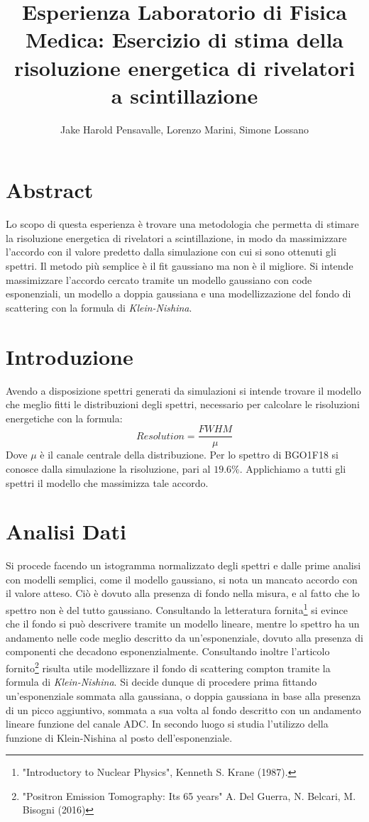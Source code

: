 \documentclass[a4paper]{article}
\title{Esperienza Laboratorio di Fisica Medica: Esercizio di stima della risoluzione energetica di rivelatori a scintillazione}
\author{Jake Harold Pensavalle, Lorenzo Marini, Simone Lossano}
\begin{document}
	\maketitle
	\newpage
	\tableofcontents
	\newpage
\section{Abstract}
Lo scopo di questa esperienza è trovare una metodologia che permetta di stimare la risoluzione energetica di rivelatori a scintillazione, in modo da massimizzare l'accordo con il valore predetto dalla simulazione con cui si sono ottenuti gli spettri. Il metodo più semplice è il fit gaussiano ma non è il migliore. Si intende massimizzare l'accordo cercato tramite un modello gaussiano con code esponenziali, un modello a doppia gaussiana e una modellizzazione del fondo di scattering con la formula di \textit{Klein-Nishina}.
\section{Introduzione}
Avendo a disposizione spettri generati da simulazioni si intende trovare il modello che meglio fitti le distribuzioni degli spettri, necessario per calcolare le risoluzioni energetiche con la formula:
\begin{equation}
Resolution=\frac{FWHM}{\mu}
\end{equation}
Dove $\mu$ è il canale centrale della distribuzione. Per lo spettro di BGO1F18 si conosce dalla simulazione la risoluzione, pari al $19.6\%$. Applichiamo a tutti gli spettri il modello che massimizza tale accordo.
\section{Analisi Dati}
Si procede facendo un istogramma normalizzato degli spettri e dalle prime analisi con modelli semplici, come il modello gaussiano, si nota un mancato accordo con il valore atteso. Ciò è dovuto alla presenza di fondo nella misura, e al fatto che lo spettro non è del tutto gaussiano. Consultando la letteratura fornita\footnote{\label{note1}"Introductory to Nuclear Physics", Kenneth S. Krane (1987).} si evince che il fondo si può descrivere tramite un modello lineare, mentre lo spettro ha un andamento nelle code meglio descritto da un'esponenziale, dovuto alla presenza di componenti che decadono esponenzialmente. Consultando inoltre l'articolo fornito\footnote{\label{note2}"Positron Emission Tomography: Its 65 years"
A. Del Guerra, N. Belcari, M. Bisogni (2016)} risulta utile modellizzare il fondo di scattering compton tramite la formula di \textit{Klein-Nishina}.
Si decide dunque di procedere prima fittando un'esponenziale sommata alla gaussiana, o doppia gaussiana in base alla presenza di un picco aggiuntivo, sommata a sua volta al fondo descritto con un andamento lineare funzione del canale ADC. In secondo luogo si studia l'utilizzo della funzione di Klein-Nishina al posto dell'esponenziale.
\end{document}
